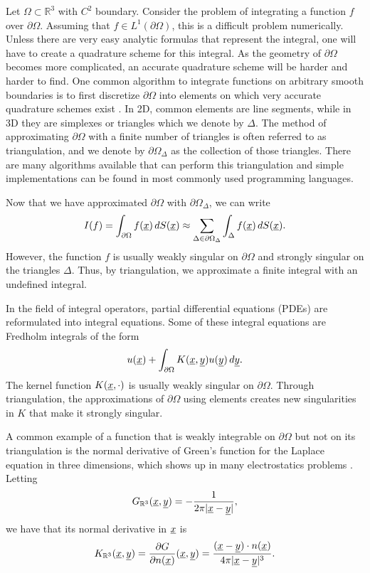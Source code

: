 \documentclass[../paper.tex]{subfiles}
\begin{document}
Let $\Omega\subset \mathbb{R}^3$ with $C^2$ boundary. Consider the problem of integrating a function $f$ over $\partial\Omega$. Assuming that $f\in L^1(\partial\Omega)$, this is a difficult problem numerically. 
Unless there are very easy analytic formulas that represent the integral, one will have to create a quadrature scheme for this integral.
As the geometry of $\partial\Omega$ becomes more complicated, an accurate quadrature scheme will be harder and harder to find.
One common algorithm to integrate functions on arbitrary smooth boundaries is to first discretize $\partial\Omega$ into elements on which very accurate quadrature schemes exist \cite{hsiao2008boundary}. In 2D, common elements are line segments, while in 3D they are simplexes or triangles which we denote by $\Delta$. The method of approximating $\partial\Omega$ with a finite number of triangles is often referred to as triangulation, and we denote by $\partial\Omega_{\Delta}$ as the collection of those triangles. 
There are many algorithms available that can perform this triangulation \cite{persson2004simple, delaunay1934spheres} and simple implementations can be found in most commonly used programming languages. 

Now that we have approximated $\partial\Omega$ with $\partial\Omega_{\Delta}$, we can write
\begin{equation}
    I(f) = \int_{\partial\Omega}f(\underline{x})\,dS(\underline{x}) \approx \sum_{\Delta \in \partial\Omega_{\Delta}} \int_{\Delta} f(\underline{x})\, dS(\underline{x}).
\end{equation}
However, the function $f$ is usually weakly singular on $\partial\Omega$ and strongly singular on the triangles $\Delta$. Thus, by triangulation, we approximate a finite integral with an undefined integral.

In the field of integral operators, partial differential equations (PDEs) are reformulated into integral equations. Some of these integral equations are Fredholm integrals of the form
\begin{equation}
    u(\underline{x}) + \int_{\partial\Omega} K(\underline{x}, \underline{y}) u(\underline{y})\, d\underline{y}.
\end{equation}
The kernel function $K(\underline{x}, \cdot)$ is usually weakly singular on $\partial\Omega$. Through triangulation, the approximations of $\partial\Omega$ using elements creates new singularities in $K$ that make it strongly singular. 

A common example of a function that is weakly integrable on $\partial\Omega$ but not on its triangulation is the normal derivative of Green's function for the Laplace equation in three dimensions, which shows up in many electrostatics problems \cite{griffith2013electrophysiology}. Letting 
\begin{equation}\label{eq: Green in 3D}
    G_{\mathbb{R}^3}(\underline{x}, \underline{y}) = -\frac{1}{2\pi |\underline{x} - \underline{y}|},
\end{equation}
we have that its normal derivative in $\underline{x}$ is 
\begin{equation}
    K_{\mathbb{R}^3}(\underline{x}, \underline{y}) = \frac{\partial G}{\partial n(\underline{x})}(\underline{x}, \underline{y}) = \frac{(\underline{x}-\underline{y})\cdot n(\underline{x})}{4\pi |\underline{x}-\underline{y}|^3}.
\end{equation}
\end{document}
